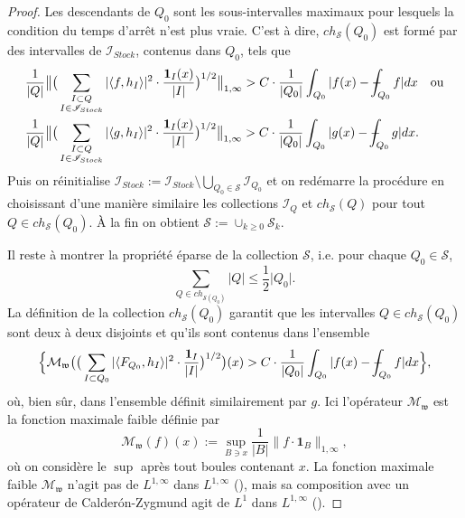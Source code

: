 \documentclass[11pt]{amsart}
\newcommand{\one}{\mathbf{1}}
\newcommand{\ii}{\mathscr}
\newcommand{\ic}{\mathcal}
\newcommand{\ds}{\displaystyle}
\def\Xint#1{\mathchoice
   {\XXint\displaystyle\textstyle{#1}}%
   {\XXint\textstyle\scriptstyle{#1}}%
   {\XXint\scriptstyle\scriptscriptstyle{#1}}%
   {\XXint\scriptscriptstyle\scriptscriptstyle{#1}}%
   \!\int}
\def\XXint#1#2#3{{\setbox0=\hbox{$#1{#2#3}{\int}$}
     \vcenter{\hbox{$#2#3$}}\kern-.5\wd0}}
\def\aver#1{\Xint-_{#1}}
\begin{document}
\begin{proof}
Les descendants de $Q_0$ sont les sous-intervalles maximaux pour lesquels la condition du temps d'arr\^et n'est plus vraie. C'est \`a dire, $ch_{\ic S}(Q_0)$ est form\'e par des intervalles de $\ii I_{Stock}$, contenus dans $Q_0$, tels que 
\begin{align*}
& \frac{1}{\vert Q \vert} \big\|  \big(  \sum_{\substack{I \subset Q    \\ I \in \ii I_{Stock}} } \vert \langle f, h_I \rangle  \vert^2 \cdot \frac{\one_I(x)}{\vert  I \vert}   \big)^{1/2} \big\|_{1, \infty} > C \cdot \frac{1}{\vert Q_0 \vert} \int_{Q_0} \vert  f(x) -\aver{Q_0} f \vert dx \quad \text{ou}\\
&\frac{1}{\vert Q \vert} \big\|  \big(  \sum_{\substack{I \subset Q    \\ I \in \ii I_{Stock}}} \vert \langle g, h_I \rangle  \vert^2 \cdot \frac{\one_I(x)}{\vert  I \vert}   \big)^{1/2} \big\|_{1, \infty} > C \cdot \frac{1}{\vert Q_0 \vert} \int_{Q_0} \vert  g(x) -\aver{Q_0} g \vert dx.
\end{align*}
Puis on r\'einitialise $\ds\ii I_{Stock}:= \ii I_{Stock} \setminus \bigcup_{Q_0 \in \ic S} \ii I_{Q_0}$ et on red\'emarre la proc\'edure en choisissant d'une mani\`ere similaire les collections $\ii I_Q$ et $ch_{\ic S}(Q)$ pour tout $Q \in ch_{\ic S}(Q_0)$. \`A la fin on obtient $\ic S :=\cup_{k\geq 0} \ic S_k$.

Il reste \`a montrer la propri\'et\'e \'eparse de la collection $\ic S$, i.e. pour chaque $Q_0 \in \ic S$, 
\[
\sum_{Q \in ch_{\ic S \left( Q_0 \right)}} \vert Q \vert \leq \frac{1}{2} \vert Q_0 \vert.
\]
La d\'efinition de la collection $ch_{\ic S}(Q_0)$ garantit que les intervalles $Q \in ch_{\ic S}(Q_0)$ sont deux \`a deux disjoints et qu'ils sont contenus dans l'ensemble
\begin{equation}
\label{eq:level-set-weak-max-f}
\Big\lbrace \ic M_{\mathfrak{w}} \big(  \big(  \sum_{I \subset Q_0 } \vert \langle F_{Q_0}, h_I \rangle  \vert^2 \cdot \frac{\one_I}{\vert  I \vert}   \big)^{1/2}  \big)(x)>  C \cdot \frac{1}{\vert Q_0 \vert} \int_{Q_0} \vert  f(x) -\aver{Q_0} f \vert dx   \Big\rbrace,
\end{equation}
o\`u, bien s\^ur, dans l'ensemble d\'efinit similairement par $g$. Ici l'op\'erateur $\ic M_{\mathfrak{w}}$ est la fonction maximale faible d\'efinie par
\[
\ic M_{\mathfrak{w}}(f)(x):=\sup_{B \ni x} \frac{1}{\vert B  \vert} \big\| f \cdot \one_B   \big\|_{1, \infty},
\]
o\`u on consid\`ere le $\sup$ apr\`es tout boules contenant $x$. La fonction maximale faible $\ic M_{\mathfrak w}$ n'agit pas de $L^{1, \infty}$ dans $L^{1, \infty}$ (\cite{weak-max-func}), mais sa composition avec un op\'erateur de Calder\'on-Zygmund agit de $L^{1}$ dans $L^{1,\infty}$ (\cite{weak-max-func+CZop}).


\end{proof}
\end{document}
